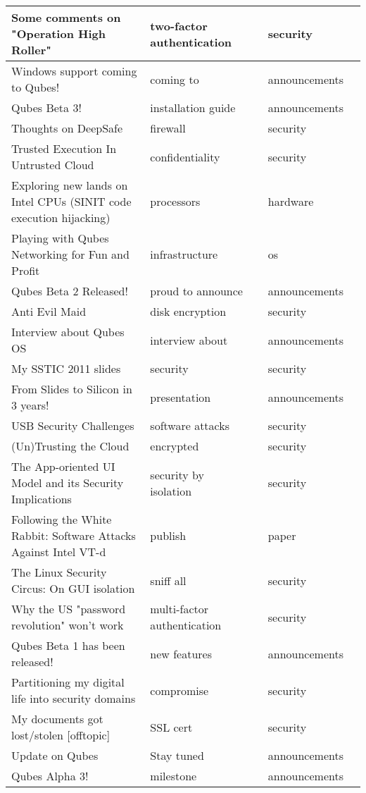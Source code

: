 \begin{small}
\begin{longtable}{|p{5cm}|l|l|l|r|}
Some comments on "Operation High Roller"&two-factor authentication&  &security&  \\ \hline 
Windows support coming to Qubes!&coming to&  &announcements&  \\ \hline 
Qubes Beta 3!&installation guide&  &announcements&  \\ \hline 
Thoughts on DeepSafe&firewall&  &security&  \\ \hline 
Trusted Execution In Untrusted Cloud&confidentiality&  &security&  \\ \hline 
Exploring new lands on Intel CPUs (SINIT code execution hijacking)&processors&  &hardware&  \\ \hline 
Playing with Qubes Networking for Fun and Profit&infrastructure&  &os&  \\ \hline 
Qubes Beta 2 Released!&proud to announce&  &announcements&  \\ \hline 
Anti Evil Maid&disk encryption&  &security&  \\ \hline 
Interview about Qubes OS&interview about&  &announcements&  \\ \hline 
My SSTIC 2011 slides&security&  &security&  \\ \hline 
From Slides to Silicon in 3 years!&presentation&  &announcements&  \\ \hline 
USB Security Challenges&software attacks&  &security&  \\ \hline 
(Un)Trusting the Cloud&encrypted&  &security&  \\ \hline 
The App-oriented UI Model and its Security Implications&security by isolation&  &security&  \\ \hline 
Following the White Rabbit: Software Attacks Against Intel VT-d&publish&  &paper&  \\ \hline 
The Linux Security Circus: On GUI isolation&sniff all&  &security&  \\ \hline 
Why the US "password revolution" won't work&multi-factor authentication&  &security&  \\ \hline 
Qubes Beta 1 has been released!&new features&  &announcements&  \\ \hline 
Partitioning my digital life into security domains&compromise&  &security&  \\ \hline 
My documents got lost/stolen [offtopic]&SSL cert&  &security&  \\ \hline 
Update on Qubes&Stay tuned&  &announcements&  \\ \hline 
Qubes Alpha 3!&milestone&  &announcements&  \\ \hline 

\end{longtable}
\end{small}
